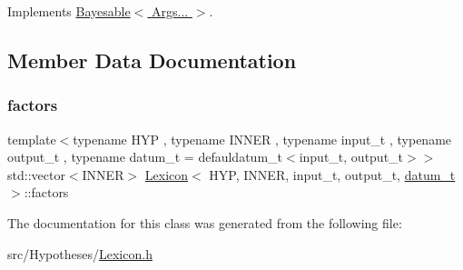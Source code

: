 Implements \hyperlink{class_bayesable_afcea9b439bcf321d5354710d8861cb54}{Bayesable$<$ Args... $>$}.



\subsection{Member Data Documentation}
\mbox{\label{class_lexicon_ac70865eb23b1e23f53f21e1760adac00}} 
\subsubsection{\texorpdfstring{factors}{factors}}
{\footnotesize\ttfamily template$<$typename H\+YP , typename I\+N\+N\+ER , typename input\+\_\+t , typename output\+\_\+t , typename datum\+\_\+t  = defauldatum\+\_\+t$<$input\+\_\+t, output\+\_\+t$>$$>$ \\
std\+::vector$<$I\+N\+N\+ER$>$ \hyperlink{class_lexicon}{Lexicon}$<$ H\+YP, I\+N\+N\+ER, input\+\_\+t, output\+\_\+t, \hyperlink{class_bayesable_a9f1a6c0cd7855550fa10b1a8f13a5867}{datum\+\_\+t} $>$\+::factors}



The documentation for this class was generated from the following file\+:\begin{DoxyCompactItemize}
\item 
src/\+Hypotheses/\hyperlink{_lexicon_8h}{Lexicon.\+h}\end{DoxyCompactItemize}
